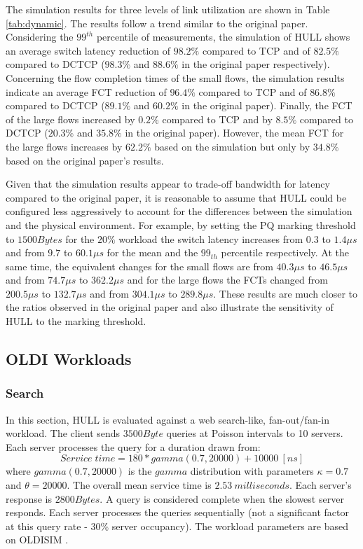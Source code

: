 \documentclass[10pt,conference,compsocconf]{IEEEtran}
\begin{document}
The simulation results for three levels of link utilization are shown in Table \ref{tab:dynamic}. The results follow a trend similar to the original paper. Considering the $99^{th}$ percentile of measurements, the simulation of HULL shows an average switch latency reduction of $98.2\%$ compared to TCP and of $82.5\%$ compared to DCTCP ($98.3\%$ and $88.6\%$ in the original paper respectively). Concerning the flow completion times of the small flows, the simulation results indicate an average FCT reduction of $96.4\%$ compared to TCP and of $86.8\%$ compared to DCTCP ($89.1\%$ and $60.2\%$ in the original paper). Finally, the FCT of the large flows increased by $0.2\%$ compared to TCP and by $8.5\%$ compared to DCTCP ($20.3\%$ and $35.8\%$ in the original paper). However, the mean FCT for the large flows increases by $62.2\%$ based on the simulation but only by $34.8\%$ based on the original paper's results. 



Given that the simulation results appear to trade-off bandwidth for latency compared to the original paper, it is reasonable to assume that HULL could be configured less aggressively to account for the differences between the simulation and the physical environment. For example, by setting the PQ marking threshold to $1500Bytes$ for the $20\%$ workload the switch latency increases from $0.3$ to $1.4\mu s$ and from $9.7$ to $60.1\mu s$ for the mean and the $99_{th}$ percentile respectively. At the same time, the equivalent changes for the small flows are from $40.3\mu s$ to $46.5\mu s$ and from $74.7\mu s$ to $362.2\mu s$ and for the large flows the FCTs changed from $200.5\mu s$ to $132.7\mu s$ and from $304.1\mu s$ to $289.8\mu s$. These results are much closer to the ratios observed in the original paper and also illustrate the sensitivity of HULL to the marking threshold.



\subsection{OLDI Workloads}




\subsubsection*{\textbf{Search}}
In this section, HULL is evaluated against a web search-like, fan-out/fan-in workload. The client sends $3500Byte$ queries at Poisson intervals to 10 servers. Each server processes the query for a duration drawn from:
\begin{equation*}
\label{gamma}
Service\; time = 180*gamma(0.7,20000)+10000\:[ns]
\end{equation*}
where $gamma(0.7,20000)$ is the $gamma$ distribution with parameters $\kappa=0.7$ and $\theta=20000$. The overall mean service time is $2.53\: milliseconds$. Each server's response is $2800Bytes$. A query is considered complete when the slowest server responds. Each server processes the queries sequentially (not a significant factor at this query rate - 30\% server occupancy). The workload parameters are based on OLDISIM \cite{OLDISIM}.
\end{document}
